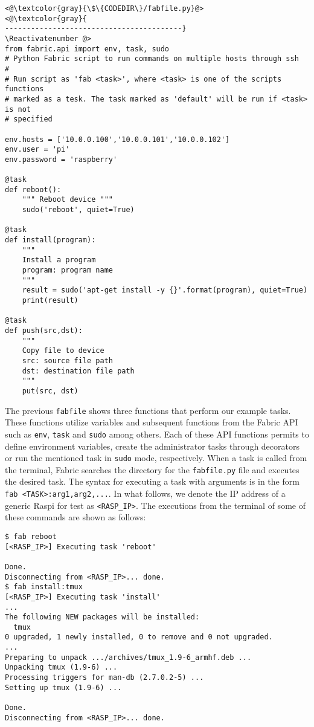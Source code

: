 \Suppressnumber\begin{lstlisting}[]
<@\textcolor{gray}{\$\{CODEDIR\}/fabfile.py}@>
<@\textcolor{gray}{
-----------------------------------------}
\Reactivatenumber @>
from fabric.api import env, task, sudo
# Python Fabric script to run commands on multiple hosts through ssh
#
# Run script as 'fab <task>', where <task> is one of the scripts functions
# marked as a tesk. The task marked as 'default' will be run if <task> is not
# specified

env.hosts = ['10.0.0.100','10.0.0.101','10.0.0.102']
env.user = 'pi'
env.password = 'raspberry'

@task
def reboot():
    """ Reboot device """
    sudo('reboot', quiet=True)

@task
def install(program):
    """
    Install a program
    program: program name
    """
    result = sudo('apt-get install -y {}'.format(program), quiet=True)
    print(result)

@task
def push(src,dst):
    """
    Copy file to device
    src: source file path
    dst: destination file path
    """
    put(src, dst)

\end{lstlisting}
\FloatBarrier

The previous \texttt{fabfile} shows three functions that perform our
example tasks. These functions utilize variables and subsequent functions
from the Fabric \ac{API} such as \texttt{env}, \texttt{task} and \texttt{sudo}
among others. Each of these \ac{API} functions permits to define environment
variables, create the administrator tasks through decorators or run the
mentioned task in \texttt{sudo} mode, respectively.
When a task is called from the terminal, Fabric searches the directory for
the \texttt{fabfile.py} file and executes the desired task. The syntax for
executing a task with arguments is in the form
\texttt{fab <TASK>:arg1,arg2,...}. In what follows, we denote the
\ac{IP} address of a generic \ac{Raspi} for test as \texttt{<RASP\_IP>}.
The executions from the terminal of some of these commands are shown as
follows:

\begin{lstlisting}[]
$ fab reboot
[<RASP_IP>] Executing task 'reboot'

Done.
Disconnecting from <RASP_IP>... done.
$ fab install:tmux
[<RASP_IP>] Executing task 'install'
...
The following NEW packages will be installed:
  tmux
0 upgraded, 1 newly installed, 0 to remove and 0 not upgraded.
...
Preparing to unpack .../archives/tmux_1.9-6_armhf.deb ...
Unpacking tmux (1.9-6) ...
Processing triggers for man-db (2.7.0.2-5) ...
Setting up tmux (1.9-6) ...

Done.
Disconnecting from <RASP_IP>... done.
\end{lstlisting}
\FloatBarrier
\vspace{-5mm}

